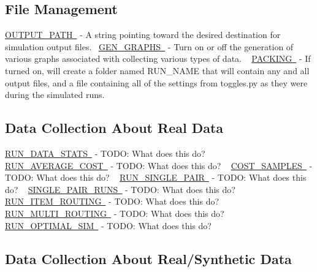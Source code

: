 \hypertarget{toggles_file}{}\subsection{File Management}\label{toggles_file}
\mbox{\hyperlink{}{O\+U\+T\+P\+U\+T\+\_\+\+P\+A\+TH }} -\/ A string pointing toward the desired destination for simulation output files.~\newline
 \mbox{\hyperlink{}{G\+E\+N\+\_\+\+G\+R\+A\+P\+HS }} -\/ Turn on or off the generation of various graphs associated with collecting various types of data. ~\newline
 \mbox{\hyperlink{}{P\+A\+C\+K\+I\+NG }} -\/ If turned on, will create a folder named R\+U\+N\+\_\+\+N\+A\+ME that will contain any and all output files, and a file containing all of the settings from toggles.\+py as they were during the simulated runs. ~\newline
 \hypertarget{toggles_data}{}\subsection{Data Collection About Real Data}\label{toggles_data}
\mbox{\hyperlink{}{R\+U\+N\+\_\+\+D\+A\+T\+A\+\_\+\+S\+T\+A\+TS }} -\/ T\+O\+DO\+: What does this do? ~\newline
 \mbox{\hyperlink{}{R\+U\+N\+\_\+\+A\+V\+E\+R\+A\+G\+E\+\_\+\+C\+O\+ST }} -\/ T\+O\+DO\+: What does this do? ~\newline
 \mbox{\hyperlink{}{C\+O\+S\+T\+\_\+\+S\+A\+M\+P\+L\+ES }} -\/ T\+O\+DO\+: What does this do? ~\newline
 \mbox{\hyperlink{}{R\+U\+N\+\_\+\+S\+I\+N\+G\+L\+E\+\_\+\+P\+A\+IR }} -\/ T\+O\+DO\+: What does this do? ~\newline
 \mbox{\hyperlink{}{S\+I\+N\+G\+L\+E\+\_\+\+P\+A\+I\+R\+\_\+\+R\+U\+NS }} -\/ T\+O\+DO\+: What does this do? ~\newline
 \mbox{\hyperlink{}{R\+U\+N\+\_\+\+I\+T\+E\+M\+\_\+\+R\+O\+U\+T\+I\+NG }} -\/ T\+O\+DO\+: What does this do? ~\newline
 \mbox{\hyperlink{}{R\+U\+N\+\_\+\+M\+U\+L\+T\+I\+\_\+\+R\+O\+U\+T\+I\+NG }} -\/ T\+O\+DO\+: What does this do? ~\newline
 \mbox{\hyperlink{}{R\+U\+N\+\_\+\+O\+P\+T\+I\+M\+A\+L\+\_\+\+S\+IM }} -\/ T\+O\+DO\+: What does this do? ~\newline
 \hypertarget{toggles_data2}{}\subsection{Data Collection About Real/\+Synthetic Data}\label{toggles_data2}
